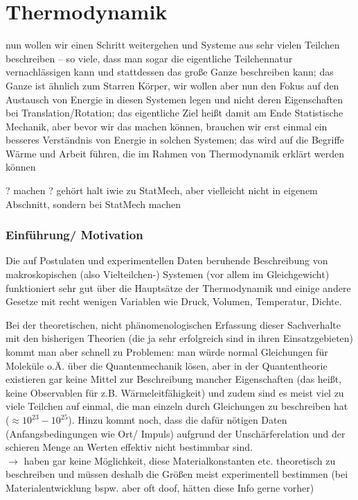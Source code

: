 \documentclass[../KlassMech_main.tex]{subfiles}
\begin{document}
\setcounter{chapter}{3}

\chapter{Thermodynamik}
nun wollen wir einen Schritt weitergehen und Systeme aus sehr vielen Teilchen beschreiben -- so viele, dass man sogar die eigentliche Teilchennatur vernachlässigen kann und stattdessen das große Ganze beschreiben kann; das Ganze ist ähnlich zum Starren Körper, wir wollen aber nun den Fokus auf den Austausch von Energie in diesen Systemen legen und nicht deren Eigenschaften bei Translation/Rotation; das eigentliche Ziel heißt damit am Ende Statistische Mechanik, aber bevor wir das machen können, brauchen wir erst einmal ein besseres Verständnis von Energie in solchen Systemen; das wird auf die Begriffe Wärme und Arbeit führen, die im Rahmen von Thermodynamik erklärt werden können


? machen ? gehört halt iwie zu StatMech, aber vielleicht nicht in eigenem Abschnitt, sondern bei StatMech machen


	\subsection{Einführung/ Motivation}
Die auf Postulaten und experimentellen Daten beruhende Beschreibung von makroskopischen (also Vielteilchen-) Systemen (vor allem im Gleichgewicht) funktioniert sehr gut über die Hauptsätze der Thermodynamik und einige andere Gesetze mit recht wenigen Variablen wie Druck, Volumen, Temperatur, Dichte.

Bei der theoretischen, nicht phänomenologischen Erfassung dieser Sachverhalte mit den bisherigen Theorien (die ja sehr erfolgreich sind in ihren Einsatzgebieten) kommt man aber schnell zu Problemen: man würde normal Gleichungen für Moleküle o.Ä. über die Quantenmechanik lösen, aber in der Quantentheorie existieren gar keine Mittel zur Beschreibung mancher Eigenschaften (das heißt, keine Observablen für z.B. Wärmeleitfähigkeit) und zudem sind es meist viel zu viele Teilchen auf einmal, die man einzeln durch Gleichungen zu beschreiben hat ($\approx 10^{23} - 10^{25}$). Hinzu kommt noch, dass die dafür nötigen Daten (Anfangsbedingungen wie Ort/ Impuls) aufgrund der Unschärferelation und der schieren Menge an Werten effektiv nicht bestimmbar sind. \medskip\\
$\rightarrow$ haben gar keine Möglichkeit, diese Materialkonstanten etc. theoretisch zu beschreiben und müssen deshalb die Größen meist experimentell bestimmen (bei Materialentwicklung bspw. aber oft doof, hätten diese Info gerne vorher)\\
\end{document}
